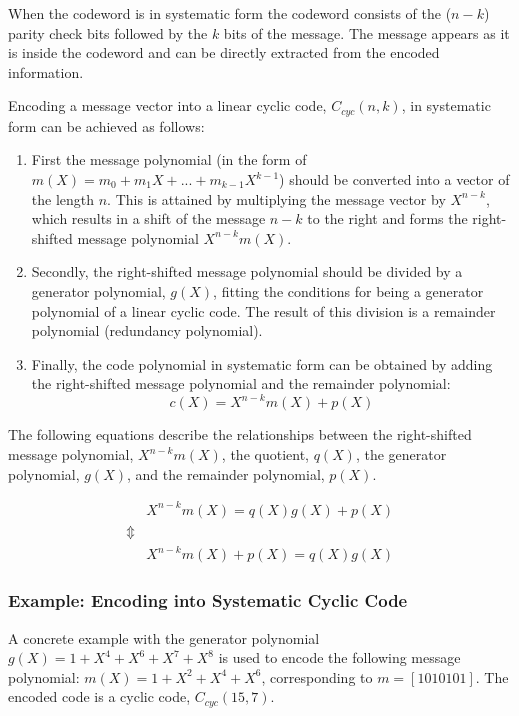 \documentclass[Main]{subfiles}
\begin{document}
When the codeword is in systematic form the codeword consists of the ($n - k$) parity check bits followed by the $k$ bits of the message. The message appears as it is inside the codeword and can be directly extracted from the encoded information. 

Encoding a message vector into a linear cyclic code, $C_{cyc}(n,k)$, in systematic form can be achieved as follows:

\begin{enumerate} \itemsep0pt \parskip0pt 
\item First the message polynomial (in the form of $m(X) = m_{0} + m_{1}X+...+m_{k-1}X^{k-1}$) should be converted into a vector of the length $n$. 
This is attained by multiplying the message vector by $X^{n-k}$, which results in a shift of the message $n-k$ to the right and forms the right-shifted message polynomial $X^{n-k}m(X)$.

\item Secondly, the right-shifted message polynomial should be divided by a generator polynomial, $g(X)$, fitting the conditions for being a generator polynomial of a linear cyclic code. 
The result of this division is a remainder polynomial (redundancy polynomial).

\item Finally, the code polynomial in systematic form can be obtained by adding the right-shifted message polynomial and the remainder polynomial: 
\begin{equation}
c(X) = X^{n-k}m(X)+p(X)
\label{eq:code_polynomial_formular}
\end{equation}
\end{enumerate}

The following equations describe the relationships between the right-shifted message polynomial, $X^{n-k}m(X)$, the quotient, $q(X)$, the generator polynomial, $g(X)$, and the remainder polynomial, $p(X)$.  

\begin{align}
& X^{n-k}m(X) = q(X)g(X)+p(X)\\
\Updownarrow \nonumber &\\
\label{eq:encoding}
& X^{n-k}m(X)+p(X) = q(X)g(X)
\end{align}

\subsubsection{Example: Encoding into Systematic Cyclic Code}
A concrete example with the generator polynomial $g(X)=1+X^4+X^6+X^7+X^8$ is used to encode the following message polynomial:
$m(X)=1+X^2+X^4+X^6$, corresponding to $m=[1010101]$. The encoded code is a cyclic code, $C_{cyc}(15,7)$.\\
\end{document}
